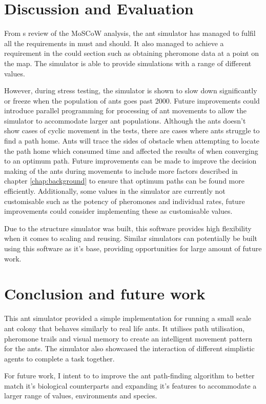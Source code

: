 \documentclass[a4paper, oneside, 11pt]{report}
\begin{document}
\chapter{Discussion and Evaluation}
\label{chap:discussion}

From s review of the MoSCoW analysis, the ant simulator has managed to fulfil all the requirements in must and should. It also managed to achieve a requirement in the could section such as obtaining pheromone data at a point on the map. The simulator is able to provide simulations with a range of different values. 

However, during stress testing, the simulator is shown to slow down significantly or freeze when the population of ants goes past 2000. Future improvements could introduce parallel programming for processing of ant movements to allow the simulator to accommodate larger ant populations. Although the ants doesn't show cases of cyclic movement in the tests, there are cases where ants struggle to find a path home. Ants will trace the sides of obstacle when attempting to locate the path home which consumed time and affected the results of when converging to an optimum path. Future improvements can be made to improve the decision making of the ants during movements to include more factors described in chapter \ref{chap:background} to ensure that optimum paths can be found more efficiently. Additionally, some values in the simulator are currently not customisable such as the potency of pheromones and individual rates, future improvements could consider implementing these as customisable values.

Due to the structure simulator was built, this software provides high flexibility when it comes to scaling and reusing. Similar simulators can potentially be built using this software as it's base, providing opportunities for large amount of future work.

\chapter{Conclusion and future work}
\label{chap:conclusion}
This ant simulator provided a simple implementation for running a small scale ant colony that behaves similarly to real life ants. It utilises path utilisation, pheromone trails and visual memory to create an intelligent movement pattern for the ants. The simulator also showcased the interaction of different simplistic agents to complete a task together.

For future work, I intent to to improve the ant path-finding algorithm to better match it's biological counterparts and expanding it's features to accommodate a larger range of values, environments and species.
\end{document}
